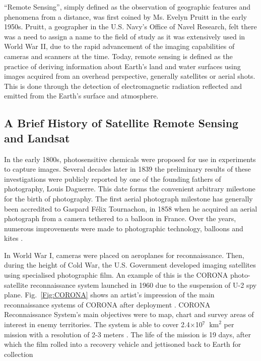 
``Remote Sensing'', simply defined as the observation of geographic features and phenomena from a distance, was first coined by Ms. Evelyn Pruitt in the early 1950s. Pruitt, a geographer in the U.S. Navy's Office of Navel Research, felt there was a need to assign a name to the field of study as it was extensively used in World War II, due to the rapid advancement of the imaging capabilities of cameras and scanners at the time. Today, remote sensing is defined as the practice of deriving information about Earth's land and water surfaces using images acquired from an overhead perspective, generally satellites or aerial shots. This is done through the detection of electromagnetic radiation reflected and emitted from the Earth's surface and atmosphere. \cite{campbell2011introduction} 


\subsection{A Brief History of Satellite Remote Sensing and Landsat}
In the early 1800s, photosensitive chemicals were proposed for use in experiments to capture images. Several decades later in 1839 the preliminary results of these investigations were publicly reported by one of the founding fathers of photography, Louis Daguerre. This date forms the convenient arbitrary milestone for the birth of photography. The first aerial photograph milestone has generally been accredited to Gaspard F\'elix Tournachon, in 1858 when he acquired an aerial photograph from a camera tethered to a balloon in France. Over the years, numerous improvements were made to photographic technology, balloons and kites \cite{campbell2011introduction}. 
\par
In World War I, cameras were placed on aeroplanes for reconnaissance. Then, during the height of Cold War, the U.S. Government developed imaging satellites using specialised photographic film. An example of this is the CORONA photo-satellite reconnaissance system launched in 1960 due to the suspension of U-2 spy plane. Fig.~\ref{Fig:CORONA} shows an artist's impression of  the main reconnaissance systems of CORONA after deployment \cite{CORONA}. CORONA Reconnaissance System's main objectives were to map, chart and survey areas of interest in enemy territories. The system is able to cover 2.4$\times$10$^{7}$ $\mathrm{~km}^{2}$ per mission with a resolution of 2-3 meters \cite{CORONA}. The life of the mission is 19 days, after which the film rolled into a recovery vehicle and jettisoned back to Earth for collection


